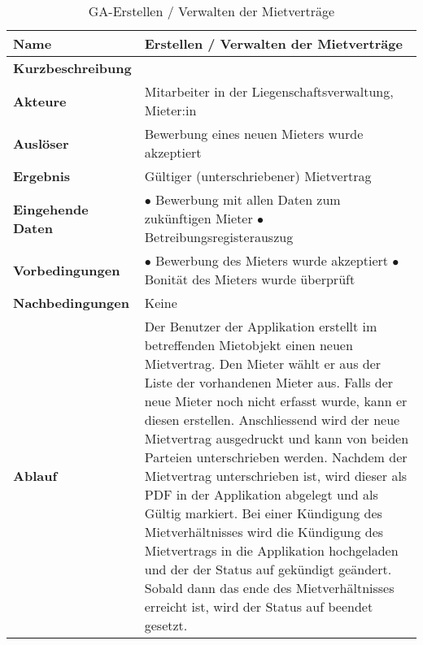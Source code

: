 \begin{table}[H]
  \centering
  \settowidth{}
  \setlength\extrarowheight{2pt}
  \begin{tabulary}{1.0\textwidth}{|a|m{12cm}|}
    \hline
    \textbf{Name}& Erstellen / Verwalten der Mietverträge\\
    \hline 
    \textbf{Kurzbeschreibung} & \\
    \hline
    \textbf{Akteure} & Mitarbeiter in der Liegenschaftsverwaltung, Mieter:in\\
    \hline
    \textbf{Auslöser} & Bewerbung eines neuen Mieters wurde akzeptiert\\
    \hline
    \textbf{Ergebnis} & Gültiger (unterschriebener) Mietvertrag\\
    \hline
    \textbf{Eingehende Daten} & 
      $\bullet$ Bewerbung mit allen Daten zum zukünftigen Mieter \newline
      $\bullet$ Betreibungsregisterauszug\\
    \hline
    \textbf{Vorbedingungen} & 
      $\bullet$ Bewerbung des Mieters wurde akzeptiert \newline
      $\bullet$ Bonität des Mieters wurde überprüft\\
    \hline
    \textbf{Nachbedingungen} & Keine\\
    \hline
    \textbf{Ablauf} & Der Benutzer der Applikation erstellt im betreffenden Mietobjekt einen neuen Mietvertrag. Den Mieter wählt er aus der Liste der vorhandenen Mieter aus. Falls der neue Mieter noch nicht erfasst wurde, kann er diesen erstellen. Anschliessend wird der neue Mietvertrag ausgedruckt und kann von beiden Parteien unterschrieben werden. Nachdem der Mietvertrag unterschrieben ist, wird dieser als PDF in der Applikation abgelegt und als Gültig markiert. Bei einer Kündigung des Mietverhältnisses wird die Kündigung des Mietvertrags in die Applikation hochgeladen und der der Status auf gekündigt geändert. Sobald dann das ende des Mietverhältnisses erreicht ist, wird der Status auf beendet gesetzt.\\
    \hline
  \end{tabulary}
  \caption{GA-Erstellen / Verwalten der Mietverträge}
\end{table}

